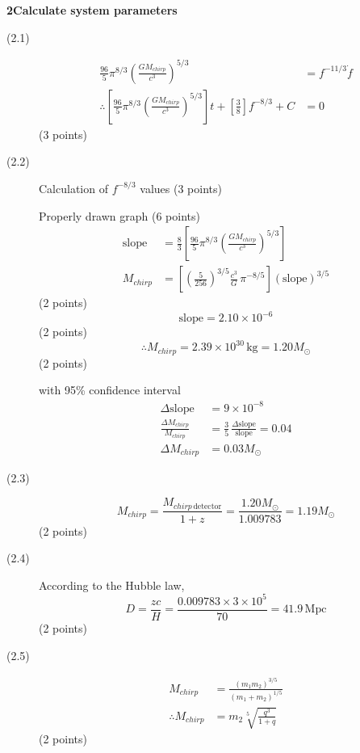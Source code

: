 \noindent\textbf{2\quad Calculate system parameters}
\begin{description}
\item[(2.1)]
  \begin{align*}
    \frac{96}{5}\pi^{8/3}
      \left(\frac{G M_{chirp}}{c^3}\right)^{5/3} &= f^{-11/3}\dot{f} \\
    \therefore \left[\frac{96}{5}\pi^{8/3}
      \left(\frac{G M_{chirp}}{c^3}\right)^{5/3}\right]t
      + \left[\frac{3}{8}\right] f^{-8/3} + C &= 0
  \end{align*}
  \hfill(3 points)

\item[(2.2)]
  Calculation of $f^{-8/3}$ values \hfill(3 points)

  Properly drawn graph \hfill(6 points)
  \begin{align*}
    \mathrm{slope} &= \frac{8}{3}\left[\frac{96}{5}\pi^{8/3}
      \left(\frac{G M_{chirp}}{c^3}\right)^{5/3}\right] \\
    M_{chirp} &= \left[\left(\frac{5}{256}\right)^{3/5}
      \frac{c^3}{G}\,\pi^{-8/5}\right](\mathrm{slope})^{3/5}
  \end{align*}
  \hfill(2 points)
  \[ \mathrm{slope} = 2.10 \times 10^{-6} \]
  \hfill(2 points)
  \[ \therefore M_{chirp} = 2.39 \times 10^{30}\,\mathrm{kg} = 1.20 M_\odot \]
  \hfill(2 points)

  with 95\% confidence interval
  \begin{align*}
    \Delta\mathrm{slope} &= 9 \times 10^{-8} \\
    \frac{\Delta M_{chirp}}{M_{chirp}}
      &= \frac{3}{5}\,\frac{\Delta\mathrm{slope}}{\mathrm{slope}} = 0.04 \\
    \Delta M_{chirp} &= 0.03 M_\odot
  \end{align*}

\item[(2.3)]
  \[ M_{chirp} = \frac{M_{chirp\,\mathrm{detector}}}{1+z}
     = \frac{1.20 M_\odot}{1.009783} = 1.19 M_\odot \]
  \hfill(2 points)

\item[(2.4)] According to the Hubble law,
  \[ D = \frac{zc}{H} = \frac{0.009783 \times 3 \times 10^5}{70}
     = 41.9\,\mathrm{Mpc} \]
  \hfill(2 points)

\item[(2.5)]
  \begin{align*}
    M_{chirp} &= \frac{(m_1 m_2)^{3/5}}{(m_1+m_2)^{1/5}} \\
    \therefore M_{chirp} &= m_2 \sqrt[5]{\frac{q^3}{1+q}}
  \end{align*}
  \hfill(2 points)


\end{description}
